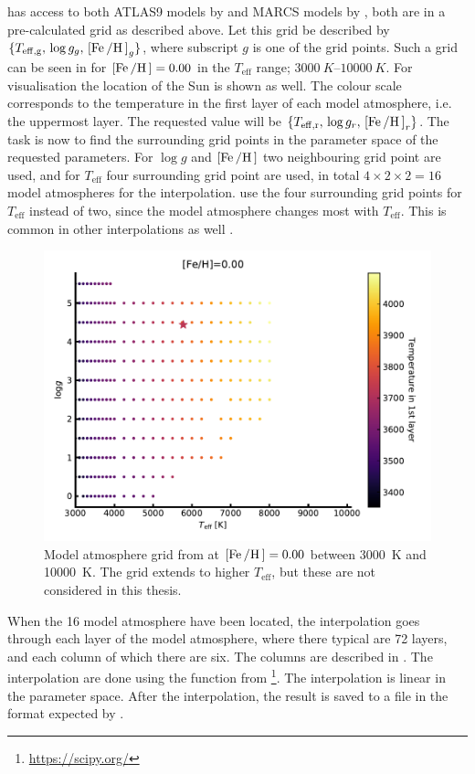  has access to both ATLAS9 models by \citet{Kurucz1993} and MARCS models by
\citet{Gustafson2008}, both are in a pre-calculated grid as described above. Let this grid be
described by $\{T_\mathrm{eff,g},\, \log g_g,\, [\ion{Fe}/\ion{H}]_g\}$, where subscript $g$ is one
of the grid points. Such a grid can be seen in  for $[\ion{Fe}/\ion{H}]=0.00$ in the
$T_\mathrm{eff}$ range; $\SIrange{3000}{10000}{K}$. For visualisation the location of the Sun is
shown as well. The colour scale corresponds to the temperature in the first layer of each model
atmosphere, i.e. the uppermost layer. The requested value will be $\{T_\mathrm{eff,r},\,\log
g_r,\,[\ion{Fe}/\ion{H}]_r\}$. The task is now to find the surrounding grid points in the parameter
space of the requested parameters. For $\log g$ and $[\ion{Fe}/\ion{H}]$ two neighbouring grid point
are used, and for $T_\mathrm{eff}$ four surrounding grid point are used, in total
$4\times2\times2=16$ model atmospheres for the interpolation.  use the four surrounding
grid points for $T_\mathrm{eff}$ instead of two, since the model atmosphere changes most with
$T_\mathrm{eff}$. This is common in other interpolations as well \citep[see e.g.][]{Valenti1996}.

\begin{figure}[htpb!]
    \centering
    \includegraphics[width=0.85\linewidth]{figures/model_atmosphere.pdf}
    \caption{Model atmosphere grid from \citet{Kurucz1993} at $[\ion{Fe}/\ion{H}]=0.00$ between
             \SI{3000}{K} and \SI{10000}{K}. The grid extends to higher $T_\mathrm{eff}$, but these
             are not considered in this thesis.}
    \label{fig:grid}
\end{figure}

When the 16 model atmosphere have been located, the interpolation goes through each layer of the
model atmosphere, where there typical are 72 layers, and each column of which there are six. The
columns are described in . The interpolation are done using the
 function from \footnote{\url{https://scipy.org/}}. The interpolation is
linear in the parameter space. After the interpolation, the result is saved to a file in the format
expected by \MOOG.




